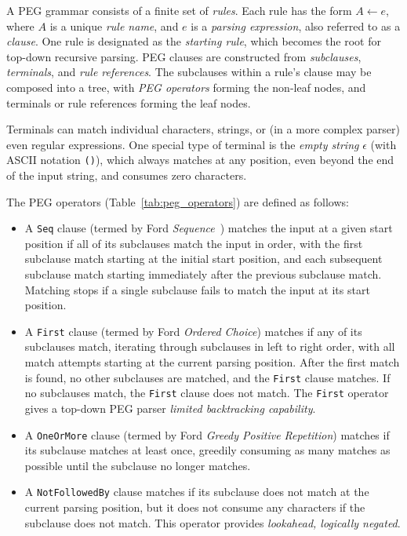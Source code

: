 \documentclass[manuscript,screen]{acmart}
\begin{document}
A PEG grammar consists of a finite set of \emph{rules}. Each rule has the form $A \leftarrow e$, where $A$ is a unique \emph{rule name}, and $e$ is a \emph{parsing expression}, also referred to as a \emph{clause}. One rule is designated as the \emph{starting rule}, which becomes the root for top-down recursive parsing. PEG clauses are constructed from \emph{subclauses}, \emph{terminals}, and \emph{rule references}. The subclauses within a rule's clause may be composed into a tree, with \emph{PEG operators} forming the non-leaf nodes, and terminals or rule references forming the leaf nodes.

Terminals can match individual characters, strings, or (in a more complex parser) even regular expressions. One special type of terminal is the \emph{empty string} $\epsilon$ (with ASCII notation \texttt{()}), which always matches at any position, even beyond the end of the input string, and consumes zero characters.

The PEG operators (Table~\ref{tab:peg_operators}) are defined as follows:

\begin{itemize}
    \item A \texttt{Seq} clause (termed by Ford \emph{Sequence}~\citep{ford2002}) matches the input at a given start position if all of its subclauses match the input in order, with the first subclause match starting at the initial start position, and each subsequent subclause match starting immediately after the previous subclause match. Matching stops if a single subclause fails to match the input at its start position.
    \item A \texttt{First} clause (termed by Ford \emph{Ordered Choice}) matches if any of its subclauses match, iterating through subclauses in left to right order, with all match attempts starting at the current parsing position. After the first match is found, no other subclauses are matched, and the \texttt{First} clause matches. If no subclauses match, the \texttt{First} clause does not match. The \texttt{First} operator gives a top-down PEG parser \emph{limited backtracking capability}.
    \item A \texttt{OneOrMore} clause (termed by Ford \emph{Greedy Positive Repetition}) matches if its subclause matches at least once, greedily consuming as many matches as possible until the subclause no longer matches.
    \item A \texttt{NotFollowedBy} clause matches if its subclause does not match at the current parsing position, but it does not consume any characters if the subclause does not match. This operator provides \emph{lookahead, logically negated}.
\end{itemize}
\end{document}
